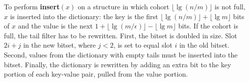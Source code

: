 \documentclass[11pt,letterpaper]{article}
\begin{document}
To perform {\bf insert$(x)$} on a structure in which cohort $\lfloor \lg (n/m) \rfloor$ is not full, $x$ is inserted into the dictionary: the key is the first $\lfloor \lg (n/m) \rfloor + \lfloor \lg m \rfloor$ bits of $x$ and the value is the next $1 + \lfloor \lg (m/\epsilon) \rfloor - \lfloor \lg m \rfloor$ bits.
If the cohort is full, the tail filter has to be rewritten.
First, the bitset is doubled in size.
Slot $2i + j$ in the new bitset, where $j < 2$, is set to equal slot $i$ in the old bitset.
Second, values from the dictionary with empty tails must be inserted into the bitset.
Finally, the dictionary is rewritten by adding an extra bit to the key portion of each key-value pair, pulled from the value portion.






\end{document}
